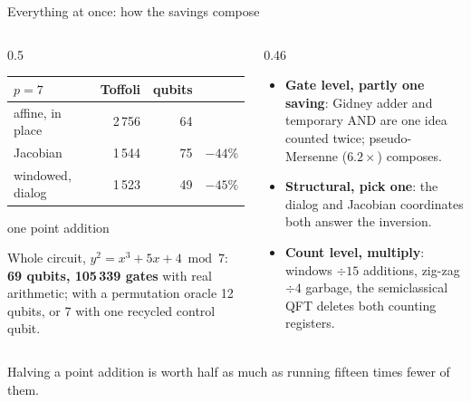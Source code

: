 \documentclass[aspectratio=169,11pt]{beamer}
\begin{document}
\setcounter{framenumber}{101}
\begin{frame}{Everything at once: how the savings compose}
  \begin{columns}[T]
    \begin{column}{0.5\textwidth}
      \centering\footnotesize
      \renewcommand{\arraystretch}{1.1}
      \begin{tabular}{@{}lrrr@{}}
        \toprule
        $p=7$ & Toffoli & qubits & \\
        \midrule
        affine, in place & 2\,756 & 64 & \\
        Jacobian & 1\,544 & 75 & $-44\%$ \\
        windowed, dialog & 1\,523 & 49 & $-45\%$ \\
        \bottomrule
      \end{tabular}\par
      {\scriptsize one point addition}\par
      \vskip2mm
      \raggedright\small
      Whole circuit, $y^2=x^3+5x+4 \bmod 7$: \textbf{69 qubits, 105\,339 gates} with real arithmetic; with a permutation oracle 12 qubits, or 7 with one recycled control qubit.
    \end{column}
    \begin{column}{0.46\textwidth}
      \small
      \begin{itemize}\setlength{\itemsep}{1mm}
        \item \textbf{Gate level, partly one saving}: Gidney adder and temporary AND are one idea counted twice; pseudo-Mersenne ($6.2\times$) composes.
        \item \textbf{Structural, pick one}: the dialog and Jacobian coordinates both answer the inversion.
        \item \textbf{Count level, multiply}: windows $\div15$ additions, zig-zag $\div4$ garbage, the semiclassical QFT deletes both counting registers.
      \end{itemize}
    \end{column}
  \end{columns}
  \begin{takeaway}Halving a point addition is worth half as much as running fifteen times fewer of them.\end{takeaway}
\end{frame}
\end{document}
